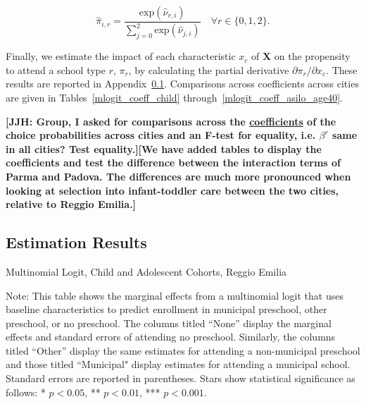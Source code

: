 \begin{equation}
\hat{\pi}_{i,r} = \frac{\text{exp}(\hat{\nu}_{r,i})}{\sum\limits_{j=0}^{2} \text{exp}(\hat{\nu}_{j,i})} \quad \forall  r \in \{0,1,2\}.
\end{equation}

Finally, we estimate the impact of each characteristic $x_c$ of $\bm{X}$ on the propensity to attend a school type $r$, $\pi_{r}$, by calculating the partial derivative $\partial \pi_{r}/\partial x_c$. These results are reported in Appendix~\ref{appendix:mlogit}. Comparisons across coefficients across cities are given in Tables~\ref{mlogit_coeff_child} through~\ref{mlogit_coeff_asilo_age40}.

\textbf{[JJH: Group, I asked for comparisons across the \ul{coefficients} of the choice probabilities across cities and an F-test for equality, i.e. $\beta^r$ same in all cities? Test equality.][We have added tables to display the coefficients and test the difference between the interaction terms of Parma and Padova. The differences are much more pronounced when looking at selection into infant-toddler care between the two cities, relative to Reggio Emilia.]}


\subsection{Estimation Results}\label{appendix:mlogit}



\begin{table}[H]
\centering
\caption{Multinomial Logit, Child and Adolescent Cohorts, Reggio Emilia} \label{mlogit-chi-ado-RE}
\begin{adjustbox}{width=\textwidth}
\begin{threeparttable}

\begin{tablenotes}
\footnotesize\raggedright{Note: This table shows the marginal effects from a multinomial logit that uses baseline characteristics to predict enrollment in municipal preschool, other preschool, or no preschool. The columns titled ``None'' display the marginal effects and standard errors of attending no preschool. Similarly, the columns titled ``Other'' display the same estimates for attending a non-municipal preschool and those titled ``Municipal" display estimates for attending a municipal school. Standard errors are reported in parentheses. Stars show statistical significance as follows: * $p < 0.05$, ** $p < 0.01$, *** $p < 0.001$.}
\end{tablenotes}
\end{threeparttable}
\end{adjustbox}
\end{table}

